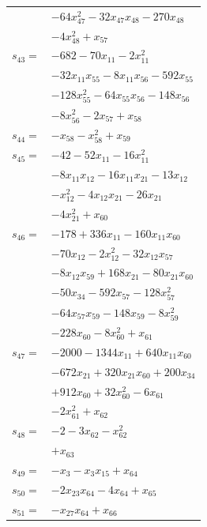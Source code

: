\begin{longtable}{@{}r@{\;}l@{}}
 & \(\displaystyle -64x_{47}^{2} -32x_{47}x_{48} -270x_{48}\) \\
 & \(\displaystyle -4x_{48}^{2} +x_{57}\) \\[3pt]
\(s_{43}=\) & \(\displaystyle -682 -70x_{11} -2x_{11}^{2}\) \\
 & \(\displaystyle -32x_{11}x_{55} -8x_{11}x_{56} -592x_{55}\) \\
 & \(\displaystyle -128x_{55}^{2} -64x_{55}x_{56} -148x_{56}\) \\
 & \(\displaystyle -8x_{56}^{2} -2x_{57} +x_{58}\) \\[3pt]
\(s_{44}=\) & \(\displaystyle -x_{58} -x_{58}^{2} +x_{59}\) \\[3pt]
\(s_{45}=\) & \(\displaystyle -42 -52x_{11} -16x_{11}^{2}\) \\
 & \(\displaystyle -8x_{11}x_{12} -16x_{11}x_{21} -13x_{12}\) \\
 & \(\displaystyle -x_{12}^{2} -4x_{12}x_{21} -26x_{21}\) \\
 & \(\displaystyle -4x_{21}^{2} +x_{60}\) \\[3pt]
\(s_{46}=\) & \(\displaystyle -178 +336x_{11} -160x_{11}x_{60}\) \\
 & \(\displaystyle -70x_{12} -2x_{12}^{2} -32x_{12}x_{57}\) \\
 & \(\displaystyle -8x_{12}x_{59} +168x_{21} -80x_{21}x_{60}\) \\
 & \(\displaystyle -50x_{34} -592x_{57} -128x_{57}^{2}\) \\
 & \(\displaystyle -64x_{57}x_{59} -148x_{59} -8x_{59}^{2}\) \\
 & \(\displaystyle -228x_{60} -8x_{60}^{2} +x_{61}\) \\[3pt]
\(s_{47}=\) & \(\displaystyle -2000 -1344x_{11} +640x_{11}x_{60}\) \\
 & \(\displaystyle -672x_{21} +320x_{21}x_{60} +200x_{34}\) \\
 & \(\displaystyle +912x_{60} +32x_{60}^{2} -6x_{61}\) \\
 & \(\displaystyle -2x_{61}^{2} +x_{62}\) \\[3pt]
\(s_{48}=\) & \(\displaystyle -2 -3x_{62} -x_{62}^{2}\) \\
 & \(\displaystyle +x_{63}\) \\[3pt]
\(s_{49}=\) & \(\displaystyle -x_{3} -x_{3}x_{15} +x_{64}\) \\[3pt]
\(s_{50}=\) & \(\displaystyle -2x_{23}x_{64} -4x_{64} +x_{65}\) \\[3pt]
\(s_{51}=\) & \(\displaystyle -x_{27}x_{64} +x_{66}\) \\[3pt]

\end{longtable}

